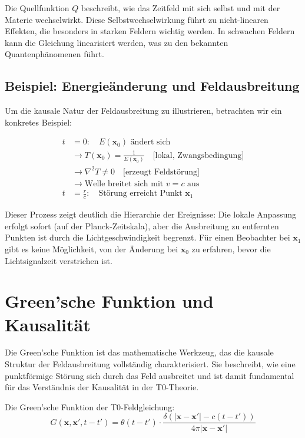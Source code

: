 	Die Quellfunktion $Q$ beschreibt, wie das Zeitfeld mit sich selbst und mit der Materie wechselwirkt. Diese Selbstwechselwirkung führt zu nicht-linearen Effekten, die besonders in starken Feldern wichtig werden. In schwachen Feldern kann die Gleichung linearisiert werden, was zu den bekannten Quantenphänomenen führt.
	
	\subsection{Beispiel: Energieänderung und Feldausbreitung}
	
	Um die kausale Natur der Feldausbreitung zu illustrieren, betrachten wir ein konkretes Beispiel:
	
	\begin{align}
		t &= 0: \quad E(\mathbf{x}_0) \text{ ändert sich} \\
		&\rightarrow T(\mathbf{x}_0) = \frac{1}{E(\mathbf{x}_0)} \quad \text{[lokal, Zwangsbedingung]} \\
		&\rightarrow \nabla^2 T \neq 0 \quad \text{[erzeugt Feldstörung]} \\
		&\rightarrow \text{Welle breitet sich mit } v = c \text{ aus} \\
		t &= \frac{r}{c}: \quad \text{Störung erreicht Punkt } \mathbf{x}_1
	\end{align}
	
	Dieser Prozess zeigt deutlich die Hierarchie der Ereignisse: Die lokale Anpassung erfolgt sofort (auf der Planck-Zeitskala), aber die Ausbreitung zu entfernten Punkten ist durch die Lichtgeschwindigkeit begrenzt. Für einen Beobachter bei $\mathbf{x}_1$ gibt es keine Möglichkeit, von der Änderung bei $\mathbf{x}_0$ zu erfahren, bevor die Lichtsignalzeit verstrichen ist.
	
	\section{Green'sche Funktion und Kausalität}
	
	Die Green'sche Funktion ist das mathematische Werkzeug, das die kausale Struktur der Feldausbreitung vollständig charakterisiert. Sie beschreibt, wie eine punktförmige Störung sich durch das Feld ausbreitet und ist damit fundamental für das Verständnis der Kausalität in der T0-Theorie.
	
	Die Green'sche Funktion der T0-Feldgleichung:
	\begin{equation}
		G(\mathbf{x},\mathbf{x}',t-t') = \theta(t-t') \cdot \frac{\delta(|\mathbf{x}-\mathbf{x}'| - c(t-t'))}{4\pi|\mathbf{x}-\mathbf{x}'|} \label{eq:green}
	\end{equation}
	
